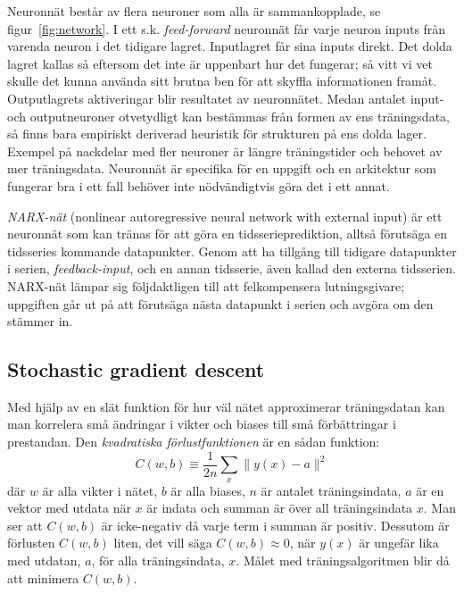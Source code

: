 Neuronnät består av flera neuroner som alla är sammankopplade, se figur~\ref{fig:network}.
I ett s.k. \textit{feed-forward} neuronnät får varje neuron inputs från
varenda neuron i det tidigare lagret.
Inputlagret får sina inputs direkt.
Det dolda lagret kallas så eftersom det inte är uppenbart hur det fungerar;
så vitt vi vet skulle det kunna använda sitt brutna ben
för att skyffla informationen framåt.
Outputlagrets aktiveringar blir resultatet av neuronnätet.
Medan antalet input- och outputneuroner otvetydligt kan bestämmas
från formen av ens träningsdata,
så finns bara empiriskt deriverad heuristik för strukturen på ens dolda lager.
Exempel på nackdelar med fler neuroner är längre träningstider
och behovet av mer träningsdata.
Neuronnät är specifika för en uppgift och en arkitektur som
fungerar bra i ett fall behöver inte nödvändigtvis göra det i ett annat.
\autocite{nielsen15}

\textit{NARX-nät} (nonlinear autoregressive neural network with external input)
är ett neuronnät som kan tränas för att göra en tidsserieprediktion, alltså
förutsäga en tidsseries kommande datapunkter.
Genom att ha tillgång till tidigare datapunkter i serien,
\textit{feedback-input}, och en annan tidsserie, även kallad den externa
tidsserien.
NARX-nät lämpar sig följdaktligen till att felkompensera lutningsgivare;
uppgiften går ut på att förutsäga nästa datapunkt i serien och avgöra om den
stämmer in.

\subsection{Stochastic gradient descent}
\label{sec:sdg}
Med hjälp av en slät funktion för hur väl nätet approximerar träningsdatan
kan man korrelera små ändringar i vikter och biases
till små förbättringar i prestandan.
Den \emph{kvadratiska förlustfunktionen} är en sådan funktion:
\begin{equation} \label{eq:cost}
	C(w, b) \equiv \frac{1}{2n} \displaystyle\sum_x \lVert y(x) - a \rVert^2
\end{equation}
där $ w $ är alla vikter i nätet, $ b $ är alla biases,
$ n $ är antalet träningsindata, $ a $ är en vektor med utdata när $ x $ är indata
och summan är över all träningsindata $ x $.
Man ser att $ C(w, b) $ är icke-negativ då varje term i summan är positiv.
Dessutom är förlusten $ C(w, b) $ liten, det vill säga $ C(w, b) \approx 0 $,
när $ y(x) $ är ungefär lika med utdatan, $ a $, för alla träningsindata, $ x $.
Målet med träningsalgoritmen blir då att minimera $ C(w, b) $.

